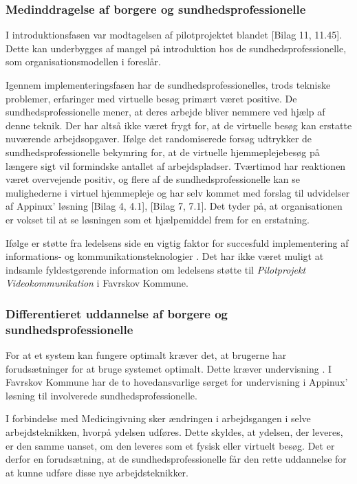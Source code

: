 \subsubsection{Medinddragelse af borgere og sundhedsprofessionelle}
I introduktionsfasen var modtagelsen af pilotprojektet blandet [Bilag 11, 11.45]. Dette kan underbygges af mangel på introduktion hos de sundhedsprofessionelle, som organisationsmodellen i  foreslår. 

Igennem implementeringsfasen har de sundhedsprofessionelles, trods tekniske problemer, erfaringer med virtuelle besøg primært været positive. De sundhedsprofessionelle mener, at deres arbejde bliver nemmere ved hjælp af denne teknik. Der har altså ikke været frygt for, at de virtuelle besøg kan erstatte nuværende arbejdsopgaver. Ifølge det randomiserede forsøg  udtrykker de sundhedsprofessionelle bekymring for, at de virtuelle hjemmeplejebesøg på længere sigt vil formindske antallet af arbejdspladser. Tværtimod har reaktionen været overvejende positiv, og flere af de sundhedsprofessionelle kan se mulighederne i virtuel hjemmepleje og har selv kommet med forslag til udvidelser af Appinux' løsning [Bilag 4, 4.1], [Bilag 7, 7.1]. Det tyder på, at organisationen er vokset til at se løsningen som et hjælpemiddel frem for en erstatning.

Ifølge  er støtte fra ledelsens side en vigtig faktor for succesfuld implementering af informations- og kommunikationsteknologier \cite{Ikt}. Det har ikke været muligt at indsamle fyldestgørende information om ledelsens støtte til \textit{Pilotprojekt Videokommunikation} i Favrskov Kommune. 

\subsubsection{Differentieret uddannelse af borgere og sundhedsprofessionelle}
For at et system kan fungere optimalt kræver det, at brugerne har forudsætninger for at bruge systemet optimalt. Dette kræver undervisning \cite{Ikt}. I Favrskov Kommune har de to hovedansvarlige sørget for undervisning i Appinux' løsning til involverede sundhedsprofessionelle. 

I forbindelse med Medicingivning sker ændringen i arbejdsgangen i selve arbejdsteknikken, hvorpå ydelsen udføres. Dette skyldes, at ydelsen, der leveres, er den samme uanset, om den leveres som et fysisk eller virtuelt besøg. Det er derfor en forudsætning, at de sundhedsprofessionelle får den rette uddannelse for at kunne udføre disse nye arbejdsteknikker.  

